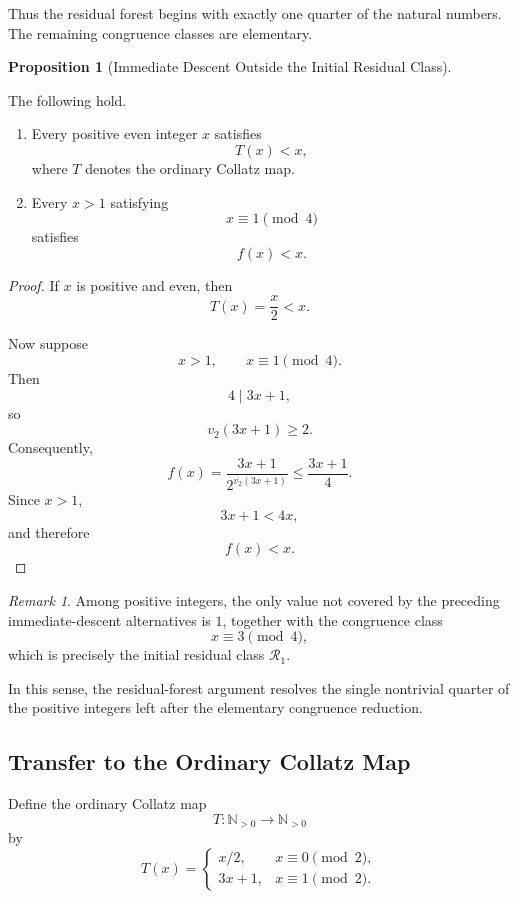\documentclass[12pt, oneside]{article}
\numberwithin{equation}{section}
\theoremstyle{definition}
\newtheorem{proposition}{Proposition}[section]
\theoremstyle{plain}
\theoremstyle{remark}
\newtheorem*{remark}{Remark}
\begin{document}
Thus the residual forest begins with exactly one quarter of the natural
numbers. The remaining congruence classes are elementary.

\begin{proposition}[Immediate Descent Outside the Initial Residual Class]
\label{prop:immediate-descent-outside-residual}

The following hold.

\begin{enumerate}
\item Every positive even integer \(x\) satisfies
\[
T(x)<x,
\]
where \(T\) denotes the ordinary Collatz map.

\item Every \(x>1\) satisfying
\[
x\equiv1\pmod4
\]
satisfies
\[
f(x)<x.
\]
\end{enumerate}
\end{proposition}

\begin{proof}
If \(x\) is positive and even, then
\[
T(x)=\frac{x}{2}<x.
\]

Now suppose
\[
x>1,
\qquad
x\equiv1\pmod4.
\]
Then
\[
4\mid 3x+1,
\]
so
\[
v_2(3x+1)\ge2.
\]
Consequently,
\[
f(x)
=
\frac{3x+1}{2^{v_2(3x+1)}}
\le
\frac{3x+1}{4}.
\]
Since \(x>1\),
\[
3x+1<4x,
\]
and therefore
\[
f(x)<x.
\]
\end{proof}

\begin{remark}
Among positive integers, the only value not covered by the preceding
immediate-descent alternatives is \(1\), together with the congruence class
\[
x\equiv3\pmod4,
\]
which is precisely the initial residual class \(\mathcal R_1\).

In this sense, the residual-forest argument resolves the single nontrivial
quarter of the positive integers left after the elementary congruence
reduction.
\end{remark}

\subsection{Transfer to the Ordinary Collatz Map}

Define the ordinary Collatz map
\[
T:\mathbb N_{>0}\to\mathbb N_{>0}
\]
by
\[
T(x)
=
\begin{cases}
x/2, & x\equiv0\pmod2,\\[4pt]
3x+1, & x\equiv1\pmod2.
\end{cases}
\]
\end{document}
